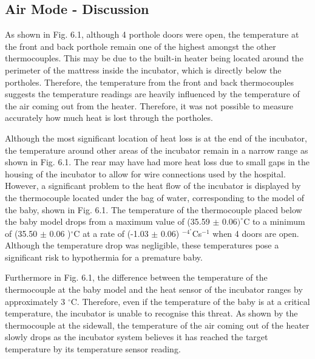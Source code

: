 \documentclass{article}
\begin{document}
\subsection{Air Mode - Discussion} \label{AirModeDiscussion}
\vspace{3mm}
As shown in Fig. 6.1, although 4 porthole doors were open, the temperature at the front and back porthole remain one of the highest amongst the other thermocouples. This may be due to the built-in heater being located around the perimeter of the mattress inside the incubator, which is directly below the portholes. Therefore, the temperature from the front and back thermocouples suggests the temperature readings are heavily influenced by the temperature of the air coming out from the heater. Therefore, it was not possible to measure accurately how much heat is lost through the portholes.

\vspace{3mm}

Although the most significant location of heat loss is at the end of the incubator, the temperature around other areas of the incubator remain in a narrow range as shown in Fig. 6.1. The rear may have had more heat loss due to small gaps in the housing of the incubator to allow for wire connections used by the hospital. However, a significant problem to the heat flow of the incubator is displayed by the thermocouple located under the bag of water, corresponding to the model of the baby, shown in Fig. 6.1. The temperature of the thermocouple placed below the baby model drops from a maximum value of (35.59 $\pm$ $0.06) ^{\circ}$C to a minimum of (35.50 $\pm$ 0.06 )$^{\circ}$C  at a rate of (-1.03 $\pm$ 0.06)  $^{-4}^{\circ}$Cs$^{-1}$ when 4 doors are open. Although the temperature drop was negligible, these temperatures pose a significant risk to hypothermia for a premature baby. 

\vspace{3mm}

Furthermore in Fig. 6.1, the difference between the temperature of the thermocouple at the baby model and the heat sensor of the incubator ranges by approximately 3 $^{\circ}$C. Therefore, even if the temperature of the baby is at a critical temperature, the incubator is unable to recognise this threat. As shown by the thermocouple at the sidewall, the temperature of the air coming out of the heater slowly drops as the incubator system believes it has reached the target temperature by its temperature sensor reading.
\end{document}

